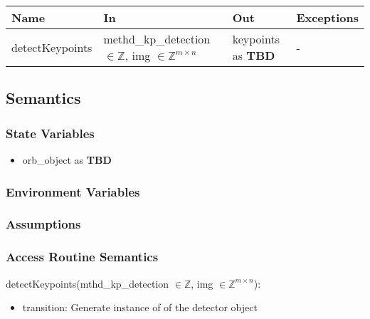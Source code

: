 \documentclass[12pt, titlepage]{article}
\begin{document}
\begin{center}
\begin{tabular}{p{3cm} p{4.5cm} p{4cm} p{2cm}}
\hline
\textbf{Name} & \textbf{In} & \textbf{Out} & \textbf{Exceptions} \\
\hline
detectKeypoints & methd\_kp\_detection $\in \mathbb{Z}$,\newline
img $\in \mathbb{Z}^{m \times n}$ & keypoints as \textbf{TBD} & - \\
\hline
\end{tabular}
\end{center}

\subsection{Semantics}

\subsubsection{State Variables}
\begin{itemize}
  \item orb\_object as \textbf{TBD}
\end{itemize}

\subsubsection{Environment Variables}


\subsubsection{Assumptions}


\subsubsection{Access Routine Semantics}


\noindent detectKeypoints(mthd\_kp\_detection $\in \mathbb{Z}$, 
img $\in \mathbb{Z}^{m \times n}$):

\begin{itemize}
  \item transition: Generate instance of of the detector object
\end{itemize}
\end{document}
